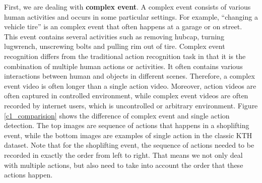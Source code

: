 First, we are dealing with \textbf{complex event}. A complex event consists of various human activities and occurs in some particular settings. For example, ``changing a vehicle tire'' is an complex event that often happens at a garage or on street. This event contains several activities such as removing hubcap, turning lugwrench, unscrewing bolts and pulling rim out of tire. Complex event recognition differs from the traditional action recognition  task in that it is the combination of multiple human actions or activities. It often contains various interactions between human and objects in different scenes. Therefore, a complex event video is often longer than a single action video. Moreover, action videos are often captured in controlled environment, while complex event videos are often recorded by internet users, which is uncontrolled or arbitrary environment. Figure \ref{c1_comparision} shows the difference of complex event and single action detection. The top images are sequence of actions that happens in a shoplifting event, while the bottom images are examples of single action in the classic KTH dataset. Note that for the shoplifting event, the sequence of actions needed to be recorded in exactly the order from left to right. That means we not only deal with multiple actions, but also need to take into account the order that these actions happen.

